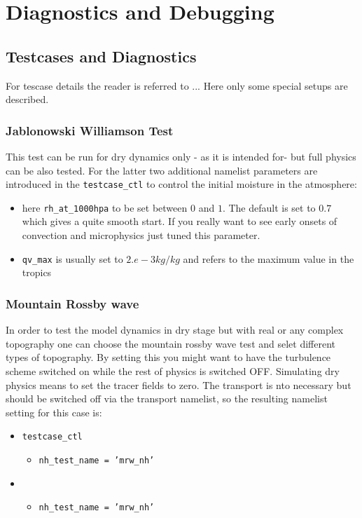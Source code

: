\chapter{Diagnostics and Debugging}


\section{Testcases and Diagnostics}

For tescase details the reader is referred to ... Here only some
special setups are described.


\subsection{Jablonowski Williamson Test}
This test can be run for dry dynamics only - as it is intended for-
but full physics can be also tested. For the latter two additional
namelist parameters are introduced in the  \texttt{testcase\_ctl} to control the initial moisture in
the atmosphere:
\begin{itemize}
\item here \texttt{rh\_at\_1000hpa} to be set between $0$ and $1$. The
default is set to $0.7$ which gives a quite smooth start. If you
really want to see early onsets of convection and microphysics just
tuned this parameter.
\item \texttt{qv\_max} is usually set to $2.e-3 kg/kg$ and refers to
the maximum value in the tropics
\end{itemize}

\subsection{Mountain Rossby wave}
In order to test the model dynamics in dry stage but with real or any
complex topography one can choose the mountain rossby wave test and
selet different types of topography. By setting this you might want to
have the turbulence scheme switched on while the rest of physics is
switched OFF. Simulating dry physics means to set the tracer fields to
zero. The transport is nto necessary but should be switched off via
the transport namelist, so the resulting namelist setting for this case is:
\begin{itemize}
\item \texttt{testcase\_ctl}
\begin{itemize}
\item  \texttt{nh\_test\_name  = 'mrw\_nh'}
\end{itemize}

\item 
\begin{itemize}
\item  \texttt{nh\_test\_name  = 'mrw\_nh'}
\end{itemize}

\end{itemize}


